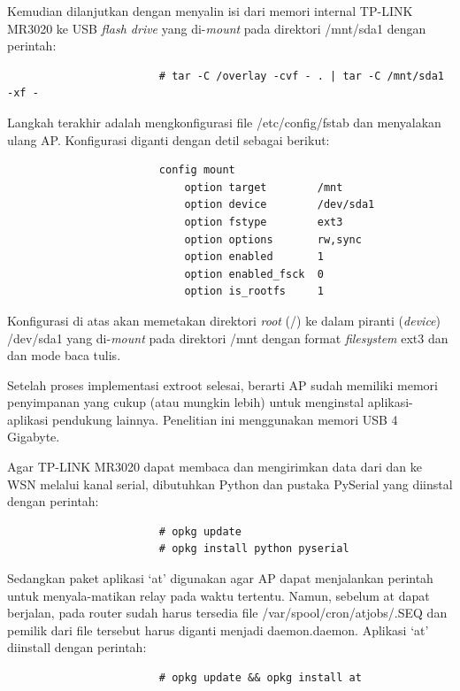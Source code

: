 				Kemudian dilanjutkan dengan menyalin isi dari memori internal TP-LINK MR3020 ke USB \emph{flash drive} yang di-\emph{mount} pada direktori /mnt/sda1 dengan perintah:
				\begingroup
				    \fontsize{10pt}{12pt}\selectfont
				    \begin{verbatim}
						# tar -C /overlay -cvf - . | tar -C /mnt/sda1 -xf -
				    \end{verbatim}  
				\endgroup

				Langkah terakhir adalah mengkonfigurasi file /etc/config/fstab dan menyalakan ulang AP. Konfigurasi diganti dengan detil sebagai berikut:
				\begingroup
				    \fontsize{10pt}{12pt}\selectfont
				    \begin{verbatim}
						config mount
					        option target        /mnt
					        option device        /dev/sda1
					        option fstype        ext3
					        option options       rw,sync
					        option enabled       1
					        option enabled_fsck  0
					        option is_rootfs     1
				    \end{verbatim}  
				\endgroup

				Konfigurasi di atas akan memetakan direktori \emph{root} (/) ke dalam piranti (\emph{device}) /dev/sda1 yang di-\emph{mount} pada direktori /mnt dengan format \emph{filesystem} ext3 dan dan mode baca tulis.

				Setelah proses implementasi extroot selesai, berarti AP sudah memiliki memori penyimpanan yang cukup (atau mungkin lebih) untuk menginstal aplikasi-aplikasi pendukung lainnya. Penelitian ini menggunakan memori USB 4 Gigabyte.

				Agar TP-LINK MR3020 dapat membaca dan mengirimkan data dari dan ke WSN melalui kanal serial, dibutuhkan Python dan pustaka PySerial yang diinstal dengan perintah:
				\begingroup
				    \fontsize{10pt}{12pt}\selectfont
				    \begin{verbatim}
						# opkg update
						# opkg install python pyserial
				    \end{verbatim}  
				\endgroup

				Sedangkan paket aplikasi `at' digunakan agar AP dapat menjalankan perintah untuk menyala-matikan relay pada waktu tertentu. Namun, sebelum at dapat berjalan, pada router sudah harus tersedia file /var/spool/cron/atjobs/.SEQ dan pemilik dari file tersebut harus diganti menjadi daemon.daemon. Aplikasi `at' diinstall dengan perintah:
				\begingroup
				    \fontsize{10pt}{12pt}\selectfont
				    \begin{verbatim}
						# opkg update && opkg install at
				    \end{verbatim}  
				\endgroup
				
